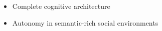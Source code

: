 \documentclass[xcolor=table]{beamer}
\begin{document}
{\begin{frame}
\begin{columns}
\begin{column}{0.3\linewidth}
{\begin{tikzpicture}
                        \end{tikzpicture}
                        }

                    {\scriptsize
                    \begin{itemize}
                        \item Complete cognitive architecture
                        \item Autonomy in semantic-rich social environments
                    \end{itemize}
                    }
                    \end{column}
                \end{columns}

            \end{frame}
            }

%



\end{document}
